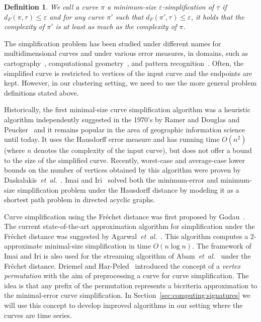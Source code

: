 \documentclass[11pt, letter]{article}
\newcommand{\etal}{\textit{e{}t~a{}l.}\xspace}
\newtheorem{definition}[theorem]{Definition}
\newcommand{\secref}[1]{Section~\ref{sec:#1}}
\newcommand{\deflab}[1]{\label{def:#1}}
\newcommand{\Frechet}{Fr\'echet\xspace}
\providecommand{\pth}[2][\!]{#1\left({#2}\right)}
\newcommand{\trajectory}[2]{\ensuremath{{#1}_{#2}}}
\newcommand{\inputSym}{\ensuremath{\tau}}
\newcommand{\inputTraj}[1]{\trajectory{\inputSym}{#1}}
\newcommand{\distFr}[2]{\ensuremath{d_F\pth{#1,#2}}}
\begin{document}
\begin{definition}\deflab{min:size:simp}
We call a curve $\pi$ a minimum-size $\varepsilon$-simplification of $\inputTraj{}$ if $\distFr{\pi}{\inputTraj{}}\leq \varepsilon$ and
for any curve $\pi'$ such that  $\distFr{\pi'}{\inputTraj{}}\leq \varepsilon$, it holds that the complexity of $\pi'$ is at least as much as the complexity of $\pi$.
\end{definition}

The simplification problem has been studied under different names for
multidimensional curves and under various error measures, in domains, such as
cartography~\cite{dp-73,ramer1972iterative}, computational
geometry~\cite{godau1991natural}, and pattern recognition~\cite{pratt2002search}. 
  Often, the simplified curve is restricted to vertices of the input curve and
  the endpoints are kept. However, in our clustering setting, we need to use  
  the more general problem definitions stated above.
  
  Historically, the first minimal-size curve simplification algorithm was a
  heuristic algorithm independently suggested in the 1970's by Ramer and Douglas
  and Peucker~\cite{dp-73,ramer1972iterative} and it remains popular in the area
  of geographic information science until today.  It uses the Hausdorff error
  measure and has running time $O(n^2)$ (where $n$ denotes the complexity of the
  input curve), but does not offer a bound to the size of the simplified curve.
  Recently, worst-case  and average-case lower bounds on the number of vertices
  obtained by this algorithm were proven by
  Daskalakis~\etal~\cite{daskalakis2010good}.  Imai and Iri~\cite{ii-pac-1988}
  solved both the minimum-error and minimum-size simplification problem under
  the Hausdorff distance by modeling it as a shortest path problem in directed
  acyclic graphs.

Curve simplification using the \Frechet distance was first proposed by
Godau~\cite{godau1991natural}.  The current state-of-the-art approximation algorithm for
simplification under the \Frechet distance was suggested by
Agarwal~\etal~\cite{ahmw-nltcs-05}. This algorithm computes a $2$-approximate
minimal-size simplification in time $O(n\log n)$.  The framework of Imai and Iri
is also used for the streaming algorithm of Abam~\etal~\cite{abh-sals-10} under
the \Frechet distance.  Driemel and Har-Peled~\cite{dh-jydfd-13} introduced the
concept of a \emph{vertex permutation} with the aim of preprocessing a curve for
curve simplification. The idea is that any prefix of the permutation represents
a bicriteria approximation to the minimal-error curve simplification. In
\secref{computing:signatures} we will use this concept to develop improved
algorithms in our setting where the curves are time series.  
\end{document}
